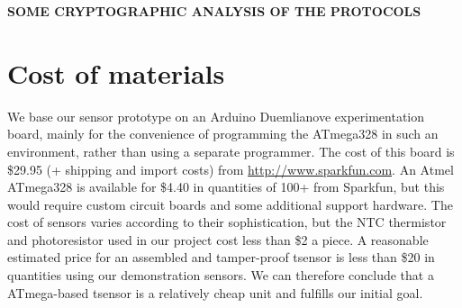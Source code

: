 \textbf{SOME CRYPTOGRAPHIC ANALYSIS OF THE PROTOCOLS}

\section{Cost of materials}

We base our sensor prototype on an Arduino Duemlianove experimentation board, mainly for the convenience of programming the ATmega328 in such an environment, rather than using a separate programmer. The cost of this board is \$29.95 (+ shipping and import costs) from \url{http://www.sparkfun.com}. An Atmel ATmega328 is available for \$4.40 in quantities of 100+ from Sparkfun, but this would require custom circuit boards and some additional support hardware. The cost of sensors varies according to their sophistication, but the NTC thermistor and photoresistor used in our project cost less than \$2 a piece. A reasonable estimated price for an assembled and tamper-proof tsensor is less than \$20 in quantities using our demonstration sensors. We can therefore conclude that a ATmega-based tsensor is a relatively cheap unit and fulfills our initial goal.

